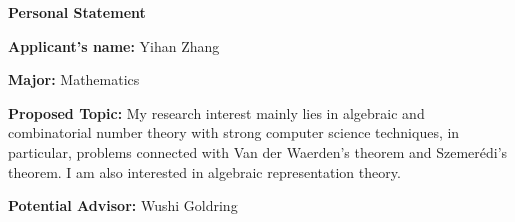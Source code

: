 \documentclass[12pt]{article}
\begin{document}
\thispagestyle{empty}

\bigskip
\bigskip

\centerline{\textbf{\Large{Personal Statement}}}

\bigskip
\bigskip

\noindent \textbf{Applicant's name:} %
Yihan Zhang

\bigskip

\noindent \textbf{Major:} %
Mathematics

\bigskip 

\noindent \textbf{Proposed Topic:} %
My research interest mainly lies in algebraic and combinatorial number theory with strong computer science techniques, in particular, problems connected with Van der Waerden's theorem and Szemer\'{e}di's theorem. I am also interested in algebraic representation theory.

\bigskip





\noindent \textbf{Potential Advisor:} %
Wushi Goldring

\bigskip
\end{document}
